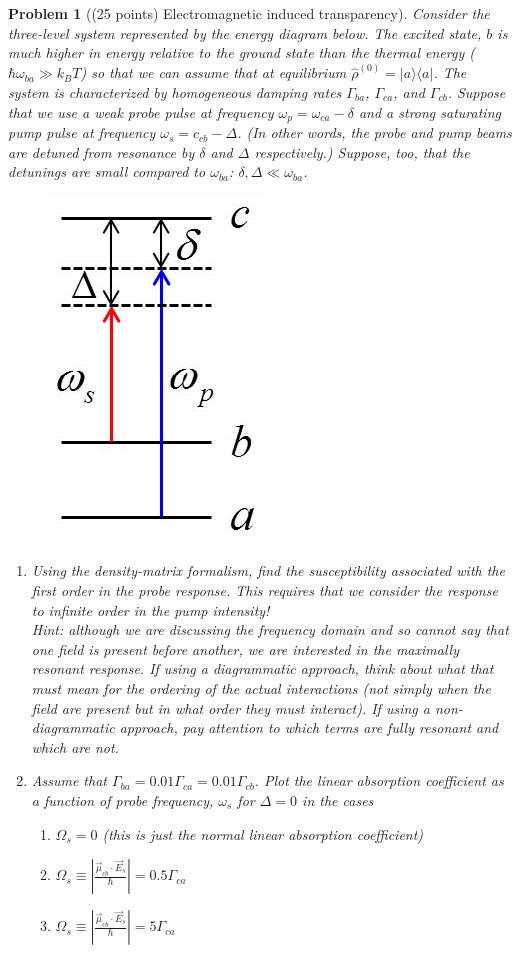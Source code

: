 \documentclass[UTF8,10pt,a4paper]{article}
\theoremstyle{Problem}
\newtheorem{prob}{Problem}
\theoremstyle{Solution}
\providecommand{\abs}[1]{\left\lvert#1\right\rvert}
\begin{document}
\thispagestyle{FirstPageStyle}
\begin{prob}[(25 points) Electromagnetic induced transparency]
    Consider the three-level system represented by the energy diagram below. The excited state, $b$ is much higher in energy relative to the ground state than the thermal energy ($\hbar\omega_{ba}\gg k_BT$) so that we can assume that at equilibrium $\hat{\rho}^{(0)}=\lvert a\rangle\langle a\rvert$. The system is characterized by homogeneous damping rates $\Gamma_{ba}$, $\Gamma_{ca}$, and $\Gamma_{cb}$. Suppose that we use a weak probe pulse at frequency $\omega_p=\omega_{ca}-\delta$ and a strong saturating pump pulse at frequency $\omega_s=c_{cb}-\Delta$. (In other words, the probe and pump beams are detuned from resonance by $\delta$ and $\Delta$ respectively.) Suppose, too, that the detunings are small compared to $\omega_{ba}$: $\delta,\Delta\ll\omega_{ba}$.
    \begin{figure}[h]
        \centering
        \includegraphics[width=.2\textwidth]{1.jpg}
    \end{figure}
    \begin{enumerate}
        \item[(a)] Using the density-matrix formalism, find the susceptibility associated with the first order \textit{in the probe response}. This requires that we consider the response to infinite order in the pump intensity!\\
        Hint: although we are discussing the frequency domain and so cannot say that one field is present before another, we are interested in the maximally resonant response. If using a diagrammatic approach, think about what that must mean for the ordering of the actual interactions (not simply when the field are present but in what order they must interact). If using a non-diagrammatic approach, pay attention to which terms are fully resonant and which are not.
        \item[(b)] Assume that $\Gamma_{ba}=0.01\Gamma_{ca}=0.01\Gamma_{cb}$. Plot the linear absorption coefficient as a function of probe frequency, $\omega_s$ for $\Delta=0$ in the cases
        \begin{enumerate}
            \item[i.] $\Omega_s=0$ (this is just the normal linear absorption coefficient)
            \item[ii.] $\Omega_s\equiv\abs{\frac{\vec{\mu}_{cb}\cdot\vec{E}_s}{\hbar}}=0.5\Gamma_{ca}$
            \item[iii.] $\Omega_s\equiv\abs{\frac{\vec{\mu}_{cb}\cdot\vec{E}_s}{\hbar}}=5\Gamma_{ca}$
        \end{enumerate}
    \end{enumerate}
\end{prob}
\end{document}
